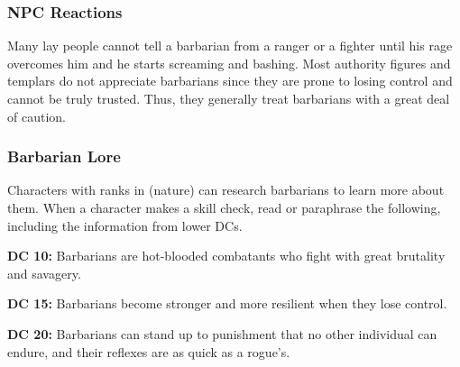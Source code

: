 \subsubsection{NPC Reactions}
Many lay people cannot tell a barbarian from a ranger or a fighter until his rage overcomes him and he starts screaming and bashing. Most authority figures and templars do not appreciate barbarians since they are prone to losing control and cannot be truly trusted. Thus, they generally treat barbarians with a great deal of caution.

\subsubsection{Barbarian Lore}
Characters with ranks in  (nature) can research barbarians to learn more about them. When a character makes a skill check, read or paraphrase the following, including the information from lower DCs.

\textbf{DC 10:} Barbarians are hot-blooded combatants who fight with great brutality and savagery.

\textbf{DC 15:} Barbarians become stronger and more resilient when they lose control.

\textbf{DC 20:} Barbarians can stand up to punishment that no other individual can endure, and their reflexes are as quick as a rogue's.
